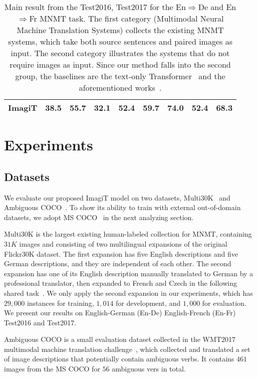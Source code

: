 \documentclass[11pt]{article}
\newcommand{\method}{ImagiT\xspace}
\begin{document}
\begin{table*}[ht]
{\begin{tabular}{l|cccc|cccc}
\method & 38.5 & 55.7 & 32.1 & 52.4 & 59.7 & 74.0 & 52.4 & 68.3 \\
\hline
\end{tabular}}
\caption{Main result from the Test2016, Test2017 for the En$\Rightarrow$De and En$\Rightarrow$Fr MNMT task. The first category (Multimodal Neural Machine Translation Systems) collects the existing MNMT systems, which take both source sentences and paired images as input. The second category illustrates the systems that do not require images as input. Since our method falls into the second group, the baselines are the text-only 
Transformer~\cite{vaswani2017attention} and the aforementioned works~\cite{zhang2019neural,elliott2017imagination}.}
\label{Table_En2DeMainResults}
\end{table*} 
\section{Experiments}
\label{sec:exp}
\subsection{Datasets}

We evaluate our proposed \method model on two datasets, Multi30K~\cite{elliott2016multi30k} and Ambiguous COCO~\cite{elliott2017findings}. To show its ability to train with external out-of-domain datasets, we adopt MS COCO~\cite{lin2014microsoft} in the next analyzing section.

Multi30K is the largest existing human-labeled collection for MNMT, containing $31K$ images and consisting of two multilingual expansions of the original Flickr30K\cite{young2014image} dataset. The first expansion has five English descriptions and five German descriptions, and they are independent of each other. The second expansion has one of its English description manually translated to German by a professional translator, then expanded to French and Czech in the following shared task~\cite{elliott2017findings,barrault2018findings}. We only apply the second expansion in our experiments, which has $29,000$ instances for training, $1,014$ for development, and $1,000$ for evaluation. We present our results on English-German (En-De) English-French (En-Fr) Test2016 and Test2017.

Ambiguous COCO is a small evaluation dataset collected in the WMT2017 multimodal machine translation challenge~\cite{elliott2017findings}, which collected and translated a set of image descriptions that potentially contain ambiguous verbs. It contains $461$ images from the MS COCO\cite{lin2014microsoft} for $56$ ambiguous vers in total. 
\end{document}
